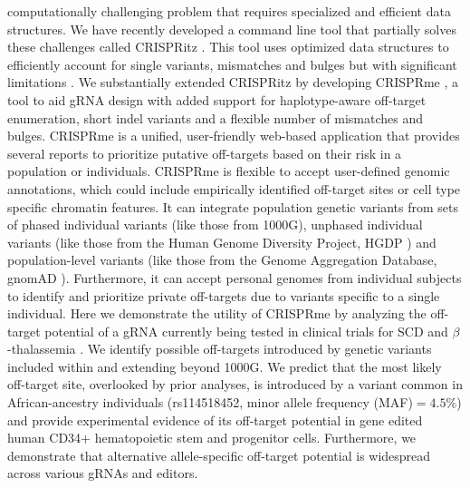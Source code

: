 \documentclass[a4paper, titlepage, openright]{book}
\begin{document}
computationally challenging problem that requires specialized and efficient data structures. We have recently developed a command line tool that partially solves these challenges called CRISPRitz \citep{cancellieri2020crispritz}. This tool uses optimized data structures to efficiently account for single variants, mismatches and bulges but with significant limitations \citep{cancellieri2020crispritz}. We substantially extended CRISPRitz by developing CRISPRme \citep{cancellieri2022human}, a tool to aid gRNA design with added support for haplotype-aware off-target enumeration, short indel variants and a flexible number of mismatches and bulges. CRISPRme is a unified, user-friendly web-based application that provides several reports to prioritize putative off-targets based on their risk in a population or individuals. CRISPRme is flexible to accept user-defined genomic annotations, which could include empirically identified off-target sites or cell type specific chromatin features. It can integrate population genetic variants from sets of phased individual variants (like those from 1000G), unphased individual variants (like those from the Human Genome Diversity Project, HGDP \citep{bergstrom2020insights}) and population-level variants (like those from the Genome Aggregation Database, gnomAD \citep{karczewski2020mutational}). Furthermore, it can accept personal genomes from individual subjects to identify and prioritize private off-targets due to variants specific to a single individual. Here we demonstrate the utility of CRISPRme by analyzing the off-target potential of a gRNA currently being tested in clinical trials for SCD and $\beta$-thalassemia \citep{frangoul2021crispr,canver2015bcl11a,wu2019highly}. We identify possible off-targets introduced by genetic variants included within and extending beyond 1000G. We predict that the most likely off-target site, overlooked by prior analyses, is introduced by a variant common in African-ancestry individuals (rs114518452, minor allele frequency (MAF)$=4.5\%$) and provide experimental evidence of its off-target potential in gene edited human CD34+ hematopoietic stem and progenitor cells. Furthermore, we demonstrate that alternative allele-specific off-target potential is widespread across various gRNAs and editors.
\end{document}
